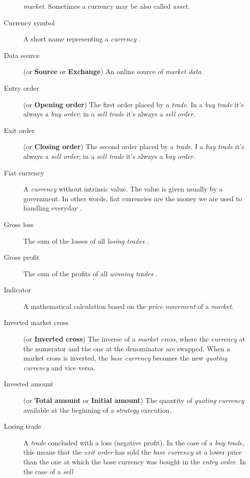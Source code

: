 \begin{description}
		\textit{market}. Sometimes a currency may be also called
		\textit{asset}.
	\item[Currency symbol] A short name representing a \textit{currency}
		.
	\item[Data source] (or \textbf{Source} or \textbf{Exchange}) An online
		source of \textit{market data}.
	\item[Entry order] (or \textbf{Opening order}) The first order placed by
		a \textit{trade}. In a \textit{buy trade} it's always a
		\textit{buy order}; in a \textit{sell trade} it's always a
		\textit{sell order}.
	\item[Exit order] (or \textbf{Closing order}) The second order placed by
		a \textit{trade}. I a \textit{buy trade} it's always a
		\textit{sell order}; in a \textit{sell trade} it's always a
		\textit{buy order}.
	\item[Fiat currency] A \textit{currency} without intrinsic value. The
		value is given usually by a government. In other words, fiat
		currencies are the money we are used to handling everyday
		.
	\item[Gross loss] The sum of the losses of all \textit{losing trades}
		.
	\item[Gross profit] The sum of the profits of all \textit{winning
		trades} .
	\item[Indicator] A mathematical calculation based on the \textit{price
		movement} of a \textit{market}.
	\item[Inverted market cross] (or \textbf{Inverted cross}) The inverse of
		a \textit{market cross}, where the \textit{currency} at the
		numerator and the one at the denominator are swapped. When a
		market cross is inverted, the \textit{base currency} becomes the
		new \textit{quoting currency} and vice versa.
	\item[Invested amount] (or \textbf{Total amount} or \textbf{Initial
		amount}) The quantity of \textit{quoting currency} available at
		the beginning of a \textit{strategy} execution.
	\item[Losing trade] A \textit{trade} concluded with a loss (negative
		profit). In the case of a \textit{buy trade}, this means that
		the \textit{exit order} has sold the \textit{base currency} at a
		lower price than the one at which the base currency was bought
		in the \textit{entry order}. In the case of a \textit{sell
}
\end{description}
